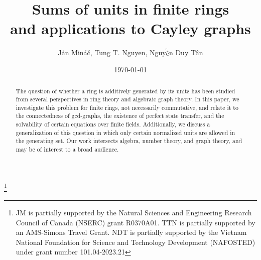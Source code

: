 \documentclass[11pt, a4paper]{amsart}
\theoremstyle{definition}
\numberwithin{equation}{section}
\begin{document}
\sloppy

\title{Sums of units in finite rings \\ and applications to Cayley graphs }
 \author{ J\'an Min\'a\v{c}, Tung T. Nguyen, Nguy$\tilde{\text{\^{e}}}$n Duy T\^{a}n }
\address{Department of Mathematics, Western University, London, Ontario, Canada N6A 5B7}
\date{\today}


 \address{Department of Mathematics, Elmhurst University, Elmhurst, Illinois, USA}
 
  \address{
Faculty of Mathematics and 	Informatics, Hanoi University of Science and Technology, 1 Dai Co Viet Road, Hanoi, Vietnam } 
 


\thanks{JM is partially supported by the Natural Sciences and Engineering Research Council of Canada (NSERC) grant R0370A01. TTN is partially supported by an AMS-Simons Travel Grant. NDT is partially supported by the Vietnam National
Foundation for Science and Technology Development (NAFOSTED) under grant number 101.04-2023.21}


\begin{abstract}
The question of whether a ring is additively generated by its units has been studied from several perspectives in ring theory and algebraic graph theory. In this paper, we investigate this problem for finite rings, not necessarily commutative, and relate it to
the connectedness of gcd-graphs, the existence of perfect state transfer, and the
solvability of certain equations over finite fields. Additionally, we discuss a generalization of this question in which only certain normalized units are allowed in the generating set. Our work intersects algebra, number theory, and graph theory, and may be of interest to a broad audience.






\end{abstract}

\maketitle
\tableofcontents 
\end{document}
